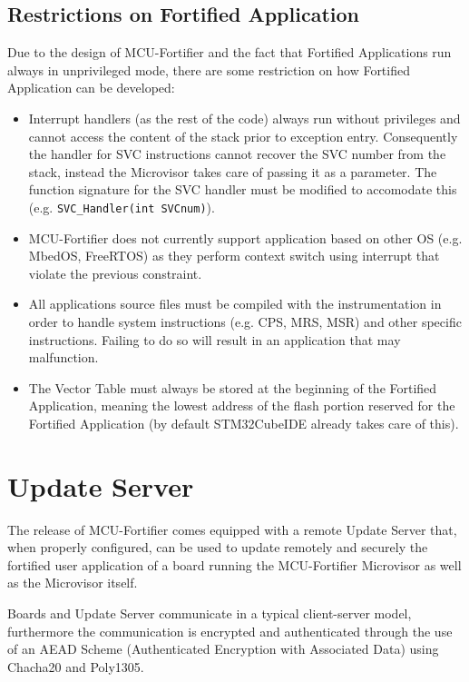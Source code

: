 \documentclass{article}
\begin{document}
\subsection{Restrictions on Fortified Application}
Due to the design of MCU-Fortifier and the fact that Fortified Applications run always in unprivileged mode, there are some restriction on how Fortified Application can be developed:
\begin{itemize}
    \item Interrupt handlers (as the rest of the code) always run without privileges and cannot access the content of the stack prior to exception entry. Consequently the handler for SVC instructions cannot recover the SVC number from the stack, instead the Microvisor takes care of passing it as a parameter. The function signature for the SVC handler must be modified to accomodate this (e.g. \verb|SVC_Handler(int SVCnum)|).
    \item MCU-Fortifier does not currently support application based on other OS (e.g. MbedOS, FreeRTOS) as they perform context switch using interrupt that violate the previous constraint.
    \item All applications source files must be compiled with the instrumentation in order to handle system instructions (e.g. CPS, MRS, MSR) and other specific instructions. Failing to do so will result in an application that may malfunction.
    \item The Vector Table must always be stored at the beginning of the Fortified Application, meaning the lowest address of the flash portion reserved for the Fortified Application (by default STM32CubeIDE already takes care of this).
\end{itemize}

\section{Update Server}
The release of MCU-Fortifier comes equipped with a remote Update Server that, when properly configured, can be used to update remotely and securely the fortified user application of a board running the MCU-Fortifier Microvisor as well as the Microvisor itself.

Boards and Update Server communicate in a typical client-server model, furthermore the communication is encrypted and authenticated through the use of an AEAD Scheme (Authenticated Encryption with Associated Data) using Chacha20 and Poly1305.
\end{document}
